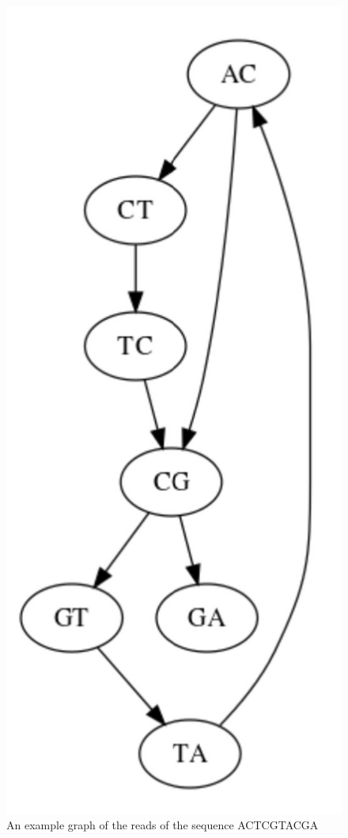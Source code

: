 \documentclass[letterpaper, 10 pt]{ieeeconf}
\begin{document}
\begin{figure}[thpb]
    \includegraphics[scale=0.4]{images/fig2-2.jpg}
    \caption{An example graph of the reads of the sequence ACTCGTACGA}
    \label{fig2}
  \end{figure}
\end{document}
